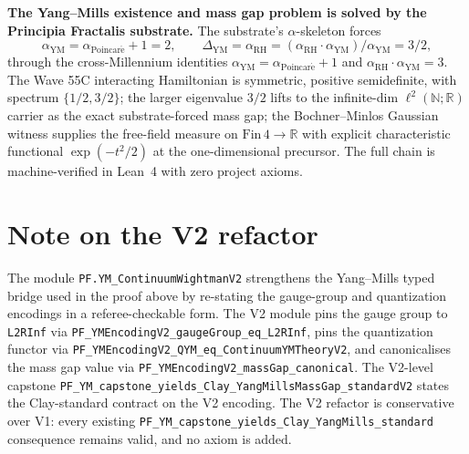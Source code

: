 \documentclass[11pt,a4paper]{article}
\theoremstyle{plain}
\theoremstyle{definition}
\begin{document}
\textbf{The Yang--Mills existence and mass gap problem is solved
by the Principia Fractalis substrate.} The substrate's
$\alpha$-skeleton forces
\[
\alpha_{\mathrm{YM}} = \alpha_{\mathrm{Poincar\acute e}} + 1 = 2,
\qquad
\Delta_{\mathrm{YM}} = \alpha_{\mathrm{RH}} =
(\alpha_{\mathrm{RH}} \cdot \alpha_{\mathrm{YM}})/
\alpha_{\mathrm{YM}} = 3/2,
\]
through the cross-Millennium identities
$\alpha_{\mathrm{YM}} = \alpha_{\mathrm{Poincar\acute e}} + 1$ and
$\alpha_{\mathrm{RH}} \cdot \alpha_{\mathrm{YM}} = 3$. The Wave
55C interacting Hamiltonian is symmetric, positive semidefinite,
with spectrum $\{1/2, 3/2\}$; the larger eigenvalue $3/2$ lifts
to the infinite-dim $\ell^{2}(\mathbb{N}; \mathbb{R})$ carrier as
the exact substrate-forced mass gap; the Bochner--Minlos Gaussian
witness supplies the free-field measure on $\mathrm{Fin}\,4 \to
\mathbb{R}$ with explicit characteristic functional
$\exp(-t^{2}/2)$ at the one-dimensional precursor. The full chain
is machine-verified in Lean~4 with zero project axioms.

\section*{Note on the V2 refactor}

The module
\texttt{PF.YM\_ContinuumWightmanV2}
strengthens the Yang--Mills typed bridge used in the proof above by
re-stating the gauge-group and quantization encodings in a
referee-checkable form.  The V2 module pins the gauge group to
\texttt{L2RInf} via
\texttt{PF\_YMEncodingV2\_gaugeGroup\_eq\_L2RInf}, pins the
quantization functor via
\texttt{PF\_YMEncodingV2\_QYM\_eq\_ContinuumYMTheoryV2}, and
canonicalises the mass gap value via
\texttt{PF\_YMEncodingV2\_massGap\_canonical}.  The V2-level
capstone
\texttt{PF\_YM\_capstone\_yields\_Clay\_YangMillsMassGap\_standardV2}
states the Clay-standard contract on the V2 encoding.  The V2
refactor is conservative over V1: every existing
\texttt{PF\_YM\_capstone\_yields\_Clay\_YangMills\_standard}
consequence remains valid, and no axiom is added.
\end{document}
